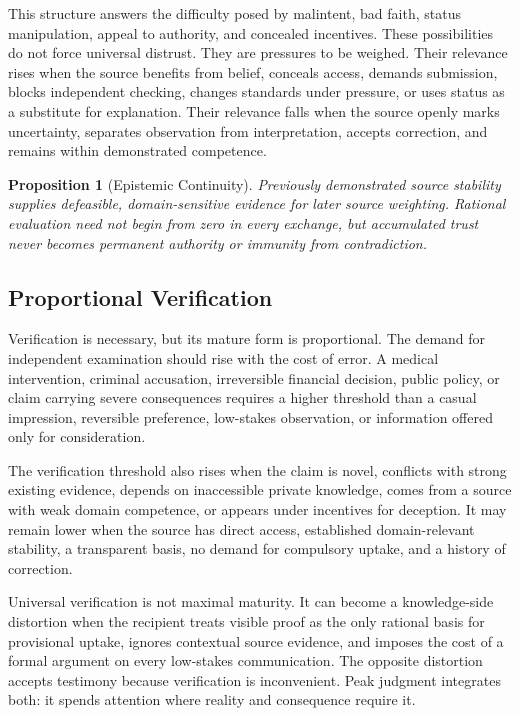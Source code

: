 \documentclass[11pt]{article}
\newtheorem{proposition}{Proposition}
\begin{document}
This structure answers the difficulty posed by malintent, bad faith, status manipulation, appeal to authority, and concealed incentives. These possibilities do not force universal distrust. They are pressures to be weighed. Their relevance rises when the source benefits from belief, conceals access, demands submission, blocks independent checking, changes standards under pressure, or uses status as a substitute for explanation. Their relevance falls when the source openly marks uncertainty, separates observation from interpretation, accepts correction, and remains within demonstrated competence.

\begin{proposition}[Epistemic Continuity]
Previously demonstrated source stability supplies defeasible, domain-sensitive evidence for later source weighting. Rational evaluation need not begin from zero in every exchange, but accumulated trust never becomes permanent authority or immunity from contradiction.
\end{proposition}

\subsection{Proportional Verification}

Verification is necessary, but its mature form is proportional. The demand for independent examination should rise with the cost of error. A medical intervention, criminal accusation, irreversible financial decision, public policy, or claim carrying severe consequences requires a higher threshold than a casual impression, reversible preference, low-stakes observation, or information offered only for consideration.

The verification threshold also rises when the claim is novel, conflicts with strong existing evidence, depends on inaccessible private knowledge, comes from a source with weak domain competence, or appears under incentives for deception. It may remain lower when the source has direct access, established domain-relevant stability, a transparent basis, no demand for compulsory uptake, and a history of correction.

Universal verification is not maximal maturity. It can become a knowledge-side distortion when the recipient treats visible proof as the only rational basis for provisional uptake, ignores contextual source evidence, and imposes the cost of a formal argument on every low-stakes communication. The opposite distortion accepts testimony because verification is inconvenient. Peak judgment integrates both: it spends attention where reality and consequence require it.
\end{document}

